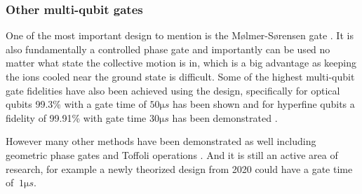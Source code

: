 \subsubsection{Other multi-qubit gates}
One of the most important design to mention is the Mølmer-Sørensen gate \cite{sorensenQuantumComputationIons1999}.
It is also fundamentally a controlled phase gate and importantly can be used no matter what state the collective motion is in, which is a big advantage as keeping the ions cooled near the ground state is difficult.
Some of the highest multi-qubit gate fidelities have also been achieved using the design, specifically for optical qubits 99.3\% with a gate time of $50\si{\micro s}$ has been shown \cite{benhelmFaulttolerantQuantumComputing2008} and for hyperfine qubits a fidelity of 99.91\% with gate time $30 \si{\micro s}$ has been demonstrated \cite{gaeblerHighFidelityUniversalGate2016}.

However many other methods have been demonstrated as well including geometric phase gates \cite{leibfriedExperimentalDemonstrationRobust2003, milburnIonTrapQuantum2000} and Toffoli operations \cite{monzRealizationQuantumToffoli2009}.
And it is still an active area of research, for example a newly theorized design from 2020 \cite{torronteguiUltrafastTwoqubitIon2020} could have a gate time of $~ 1 \si{\micro s}$.






